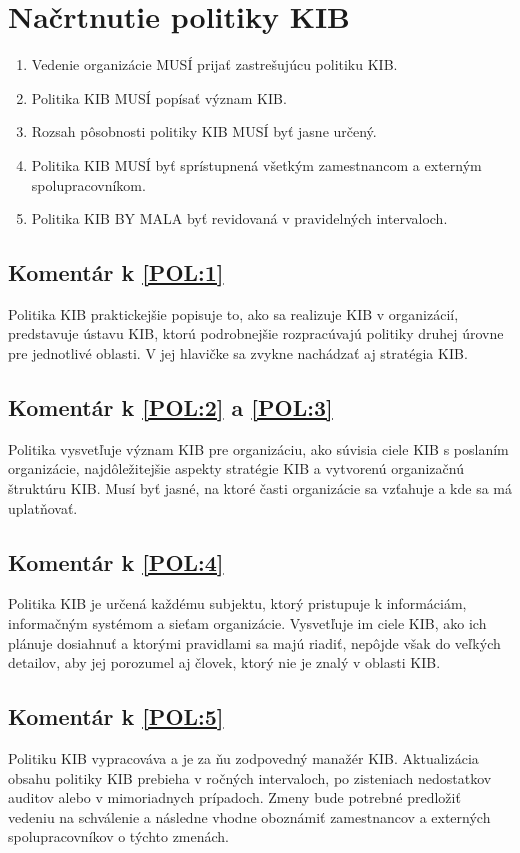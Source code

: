 \section{Načrtnutie politiky KIB}
\begin{enumerate}
  \item \label{POL:1} Vedenie organizácie MUSÍ prijať zastrešujúcu politiku KIB.
  \item \label{POL:2} Politika KIB MUSÍ popísať význam KIB.
  \item \label{POL:3} Rozsah pôsobnosti politiky KIB MUSÍ byť jasne určený.
  \item \label{POL:4} Politika KIB MUSÍ byť sprístupnená všetkým zamestnancom a externým spolupracovníkom.
  \item \label{POL:5} Politika KIB BY MALA byť revidovaná v pravidelných intervaloch.
\end{enumerate}

\subsection*{Komentár k \ref{POL:1}}
Politika KIB praktickejšie popisuje to, ako sa realizuje KIB v organizácií, predstavuje ústavu KIB, ktorú podrobnejšie
rozpracúvajú politiky druhej úrovne pre jednotlivé oblasti. V jej hlavičke sa zvykne nachádzať aj stratégia KIB.

\subsection*{Komentár k \ref{POL:2} a \ref{POL:3}}
Politika vysvetľuje význam KIB pre organizáciu, ako súvisia ciele KIB s poslaním organizácie, najdôležitejšie aspekty
stratégie KIB a vytvorenú organizačnú štruktúru KIB. Musí byť jasné, na ktoré časti organizácie sa vzťahuje a kde sa má 
uplatňovať.

\subsection*{Komentár k \ref{POL:4}}
Politika KIB je určená každému subjektu, ktorý pristupuje k informáciám, informačným systémom a sieťam organizácie. Vysvetľuje
im ciele KIB, ako ich plánuje dosiahnuť a ktorými pravidlami sa majú riadiť, nepôjde však do veľkých detailov, aby jej
porozumel aj človek, ktorý nie je znalý v oblasti KIB.

\subsection*{Komentár k \ref{POL:5}}
Politiku KIB vypracováva a je za ňu zodpovedný manažér KIB. Aktualizácia obsahu politiky KIB prebieha v ročných intervaloch,
po zisteniach nedostatkov auditov alebo v mimoriadnych prípadoch. Zmeny bude potrebné predložiť vedeniu na schválenie a
následne vhodne oboznámiť zamestnancov a externých spolupracovníkov o týchto zmenách.


